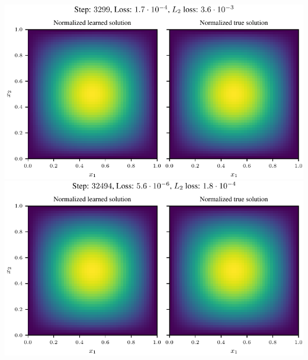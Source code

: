 \documentclass[12pt,usepdftitle=false,aspectratio=169]{beamer}
\begin{document}
\begin{frame}
\begin{columns}
\begin{column}[b]{0.53\linewidth}
{\begin{animateinline}{1.0}
          \includegraphics[width=\linewidth]{../kfac_pinns_exp/exp42_visualize_solutions/visualize_solution/SGD/poisson_2d_sin_product_mlp-tanh-64_SGD_step0003299.pdf}%
          \newframe[1.0]%
          \includegraphics[width=\linewidth]{../kfac_pinns_exp/exp42_visualize_solutions/visualize_solution/SGD/poisson_2d_sin_product_mlp-tanh-64_SGD_step0032494.pdf}%
        \end{animateinline}
      } \vspace*{-5.5ex}
    \end{column}
  \end{columns}


\end{frame}
\end{document}

